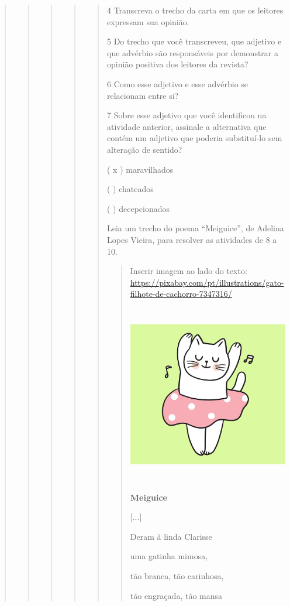 \begin{boxlist}
{{\begin{quote}
\begin{quote}
\begin{quote}
{\begin{quote}
{\begin{quote}
\num{4} Transcreva o trecho da carta em que os leitores expressam sua opinião.

\num{5} Do trecho que você transcreveu, que adjetivo e que advérbio são responsáveis por demonstrar a opinião positiva dos leitores da revista?

\num{6} Como esse adjetivo e esse advérbio se relacionam entre si?

\num{7} Sobre esse adjetivo que você identificou na atividade anterior, assinale a alternativa que contém um adjetivo que poderia substituí-lo sem alteração de sentido?

( x ) maravilhados

( ) chateados

( ) decepcionados

Leia um trecho do poema ``Meiguice'', de Adelina Lopes Vieira, para resolver as atividades de 8 a 10.

\begin{quote}
Inserir imagem ao lado do texto:
\url{https://pixabay.com/pt/illustrations/gato-filhote-de-cachorro-7347316/}

\includegraphics[width=3.41667in,height=3.07500in]{media/image23.png}

\textbf{Meiguice}

{[}...{]}

Deram à linda Clarisse

uma gatinha mimosa,

tão branca, tão carinhosa,

tão engraçada, tão mansa


\end{quote}
\end{quote}}
\end{quote}}
\end{quote}
\end{quote}
\end{quote}}}
\end{boxlist}
